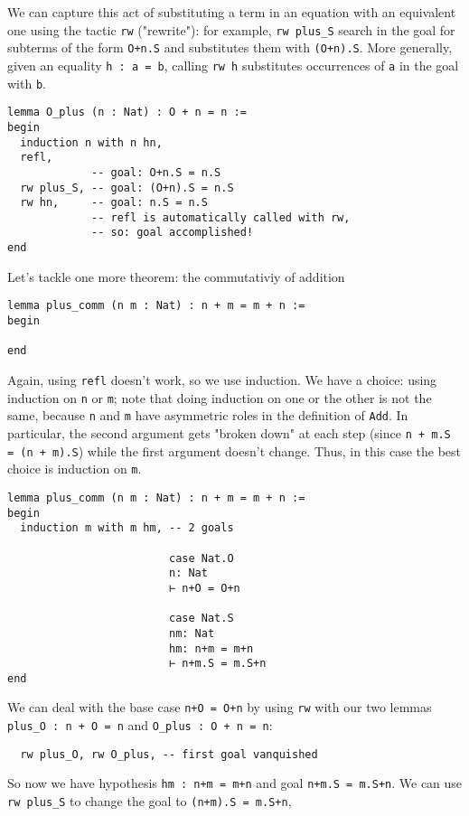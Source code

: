 \documentclass{book}
\theoremstyle{definition}
\theoremstyle{remark}
\theoremstyle{plain}
\begin{document}
We can capture this act of substituting a term in an equation with an equivalent one using the tactic \lstinline{rw} ("rewrite"):
for example, \lstinline{rw plus_S} search in the goal for subterms of the form \lstinline{O+n.S} and substitutes them with \lstinline{(O+n).S}.
More generally, given an equality \lstinline{h : a = b}, calling \lstinline{rw h} substitutes occurrences of \lstinline{a} in the goal with \lstinline{b}.
\begin{lstlisting}
lemma O_plus (n : Nat) : O + n = n :=
begin
  induction n with n hn,
  refl,
             -- goal: O+n.S = n.S
  rw plus_S, -- goal: (O+n).S = n.S
  rw hn,     -- goal: n.S = n.S
             -- refl is automatically called with rw,
             -- so: goal accomplished!
end
\end{lstlisting}
Let's tackle one more theorem: the commutativiy of addition
\begin{lstlisting}
lemma plus_comm (n m : Nat) : n + m = m + n :=
begin

end
\end{lstlisting}
Again, using \lstinline{refl} doesn't work, so we use induction.
We have a choice: using induction on \lstinline{n} or \lstinline{m};
note that doing induction on one or the other is not the same,
because \lstinline{n} and \lstinline{m} have asymmetric roles in the definition of \lstinline{Add}.
In particular, the second argument gets "broken down" at each step
(since \lstinline{n + m.S = (n + m).S}) while the first argument doesn't change.
Thus, in this case the best choice is induction on \lstinline{m}.
\begin{lstlisting}
lemma plus_comm (n m : Nat) : n + m = m + n :=
begin
  induction m with m hm, -- 2 goals

                         case Nat.O
                         n: Nat
                         ⊢ n+O = O+n

                         case Nat.S
                         nm: Nat
                         hm: n+m = m+n
                         ⊢ n+m.S = m.S+n
end
\end{lstlisting}
We can deal with the base case \lstinline{n+O = O+n} by using \lstinline{rw} with our two lemmas
\lstinline{plus_O : n + O = n} and \lstinline{O_plus : O + n = n}:
\begin{lstlisting}
  rw plus_O, rw O_plus, -- first goal vanquished
\end{lstlisting}
So now we have hypothesis \lstinline{hm : n+m = m+n} and goal \lstinline{n+m.S = m.S+n}.
We can use \lstinline{rw plus_S} to change the goal to \lstinline{(n+m).S = m.S+n},
\end{document}
